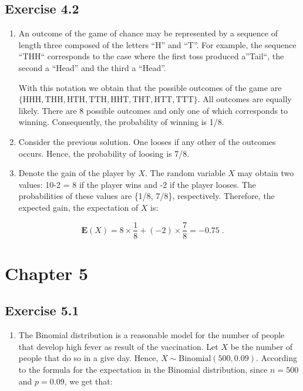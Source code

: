 \documentclass[
]{krantz}
\providecommand{\tightlist}{%
  \setlength{\itemsep}{0pt}\setlength{\parskip}{0pt}}
\newcommand{\Expec}{\mathbf{E}}
\theoremstyle{definition}
\theoremstyle{definition}
\theoremstyle{definition}
\theoremstyle{remark}
\begin{document}
\hypertarget{exercise-4.2}{%
\subsection*{Exercise 4.2}\label{exercise-4.2}}


\begin{enumerate}
\def\labelenumi{\arabic{enumi}.}
\item
  An outcome of the game of chance
  may be represented by a sequence of length three composed of the letters
  ``H'' and ``T''. For example, the sequence ``THH`` corresponds to the case
  where the first toss produced a''Tail``, the second a ``Head'' and the
  third a ``Head''.

  With this notation we obtain that the possible outcomes of the game are
  \(\{\mbox{HHH}, \mbox{THH},\mbox{HTH}, \mbox{TTH},\mbox{HHT}, \mbox{THT},\mbox{HTT}, \mbox{TTT}\}\). All outcomes are equally likely. There are 8 possible outcomes and only
  one of which corresponds to winning. Consequently, the probability of winning is 1/8.
\item
  Consider the previous solution.
  One looses if any other of the outcomes occurs. Hence, the probability
  of loosing is 7/8.
\item
  Denote the gain of the player by
  \(X\). The random variable \(X\) may obtain two values: 10-2 = 8 if the
  player wins and -2 if the player looses. The probabilities of these
  values are \{1/8, 7/8\}, respectively. Therefore, the expected gain, the
  expectation of \(X\) is:
\end{enumerate}

\[\Expec(X) = 8 \times \frac{1}{8} + (-2) \times \frac{7}{8} =-0.75\;.\]

\hypertarget{chapter-5}{%
\section*{Chapter 5}\label{chapter-5}}


\hypertarget{exercise-5.1}{%
\subsection*{Exercise 5.1}\label{exercise-5.1}}


\begin{enumerate}
\def\labelenumi{\arabic{enumi}.}
\tightlist
\item
  The Binomial distribution is a
  reasonable model for the number of people that develop high fever as
  result of the vaccination. Let \(X\) be the number of people that do so in
  a give day. Hence, \(X \sim \mbox{Binomial}(500,0.09)\). According to the
  formula for the expectation in the Binomial distribution, since \(n=500\)
  and \(p=0.09\), we get that:
\end{enumerate}
\end{document}
